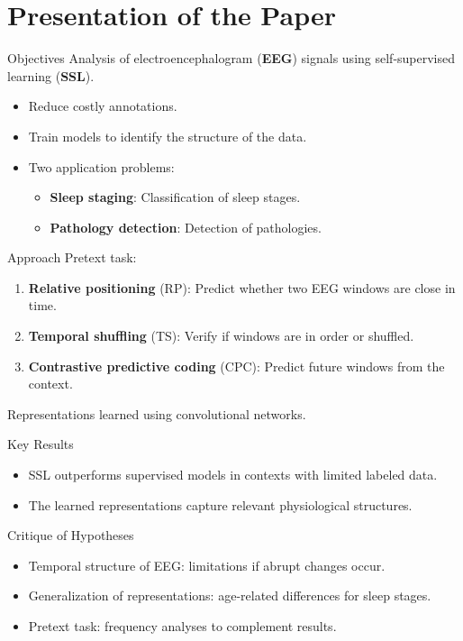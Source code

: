 \section{Presentation of the Paper}

\begin{frame}{Objectives}
Analysis of electroencephalogram (\textbf{EEG}) signals using self-supervised learning (\textbf{SSL}).
\begin{itemize}
    \item Reduce costly annotations.
    \item Train models to identify the structure of the data.
    \item Two application problems:
    \begin{itemize}
        \item \textbf{Sleep staging}: Classification of sleep stages.
        \item \textbf{Pathology detection}: Detection of pathologies.
    \end{itemize}
\end{itemize}
\end{frame}

\begin{frame}{Approach}
Pretext task:
    \begin{enumerate}
        \item \textbf{Relative positioning} (RP): Predict whether two EEG windows are close in time.
        \item \textbf{Temporal shuffling} (TS): Verify if windows are in order or shuffled.
        \item \textbf{Contrastive predictive coding} (CPC): Predict future windows from the context.
    \end{enumerate}
Representations learned using convolutional networks.
\end{frame}

\begin{frame}{Key Results}
\begin{itemize}
    \item SSL outperforms supervised models in contexts with limited labeled data.
    \item The learned representations capture relevant physiological structures.
\end{itemize}
\end{frame}

\begin{frame}{Critique of Hypotheses}
\begin{itemize}
    \item Temporal structure of EEG: limitations if abrupt changes occur.
    \item Generalization of representations: age-related differences for sleep stages.
    \item Pretext task: frequency analyses to complement results.
\end{itemize}
\end{frame}
